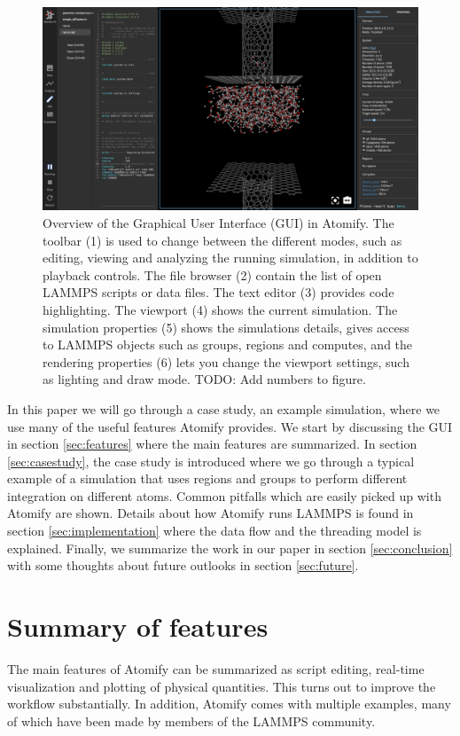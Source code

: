 \documentclass[aps,pre,twocolumn,letterpaper,floatfix,nofootinbib]{revtex4}
\begin{document}
\begin{figure}
	\centering
	\includegraphics[width=\textwidth]{gui.png}
	\caption{%
    Overview of the Graphical User Interface (GUI) in Atomify.
    The toolbar (1) is used to change between the different modes, such as 
    editing, viewing and analyzing the running simulation, 
    in addition to playback controls.
    The file browser (2) contain the list of open LAMMPS scripts or data files.
    The text editor (3) provides code highlighting.
    The viewport (4) shows the current simulation.
    The simulation properties (5) shows the simulations details, gives access to 
    LAMMPS objects such as groups, regions and computes, and the rendering
    properties (6) lets you change the viewport settings, such as lighting and
    draw mode.
    TODO: Add numbers to figure.
    }
	\label{fig:gui}
\end{figure}

In this paper we will go through a case study, an example simulation, where we
use many of the useful features Atomify provides.
We start by discussing the GUI in section \ref{sec:features} where the main features are summarized.
In section \ref{sec:casestudy}, the case study is introduced where we go through a typical example
of a simulation that uses regions and groups to perform different integration on different atoms.
Common pitfalls which are easily picked up with Atomify are shown.
Details about how Atomify runs LAMMPS is found in section \ref{sec:implementation} where the data flow and the threading model is explained.
Finally, we summarize the work in our paper in section \ref{sec:conclusion} with some thoughts about future outlooks in section \ref{sec:future}.

\section{\label{sec:features}Summary of features}
The main features of Atomify can be summarized as script editing,
real-time visualization and plotting of physical quantities.
This turns out to improve the workflow substantially.
In addition, Atomify comes with multiple examples,
many of which have been made by members of the LAMMPS community.
\end{document}
